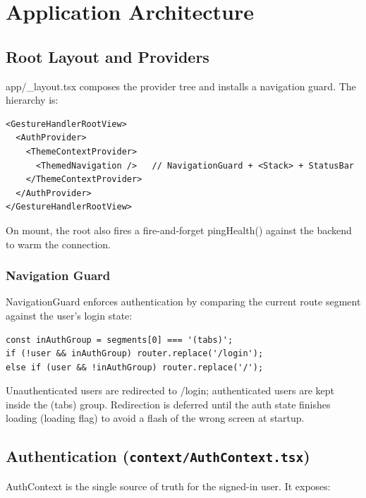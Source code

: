 \documentclass[11pt,a4paper]{article}
\newcommand{\code}[1]{\colorbox{codebg}{\ttfamily\small #1}}
\begin{document}
\section{Application Architecture}

\subsection{Root Layout and Providers}

\code{app/\_layout.tsx} composes the provider tree and installs a navigation
guard. The hierarchy is:

\begin{lstlisting}[language=tsx]
<GestureHandlerRootView>
  <AuthProvider>
    <ThemeContextProvider>
      <ThemedNavigation />   // NavigationGuard + <Stack> + StatusBar
    </ThemeContextProvider>
  </AuthProvider>
</GestureHandlerRootView>
\end{lstlisting}

On mount, the root also fires a fire-and-forget \code{pingHealth()} against the
backend to warm the connection.

\subsubsection{Navigation Guard}

\code{NavigationGuard} enforces authentication by comparing the current route
segment against the user's login state:

\begin{lstlisting}[language=tsx]
const inAuthGroup = segments[0] === '(tabs)';
if (!user && inAuthGroup) router.replace('/login');
else if (user && !inAuthGroup) router.replace('/');
\end{lstlisting}

Unauthenticated users are redirected to \code{/login}; authenticated users are
kept inside the \code{(tabs)} group. Redirection is deferred until the auth
state finishes loading (\code{loading} flag) to avoid a flash of the wrong
screen at startup.

\subsection{Authentication (\texttt{context/AuthContext.tsx})}
\label{sec:auth}

\code{AuthContext} is the single source of truth for the signed-in user. It
exposes:
\end{document}
